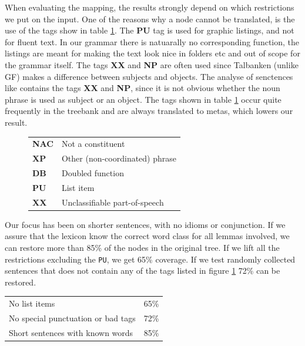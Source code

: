 \documentclass{report}
\begin{document}
When evaluating the mapping, the results strongly depend on which restrictions we
put on the input. 
One of the reasons why a node cannot be translated, is the 
use of the tags show in table \ref{fig:mapBadtag}.
The \textbf{PU} tag is used for graphic listings, and not for fluent text.
In our grammar there is natuarally no corresponding function, 
the listings are meant for making the text look nice in
folders etc and out of scope for the grammar itself. The tags \textbf{XX} and \textbf{NP} are often used since
Talbanken (unlike GF) makes a difference between subjects
and objects. %
The analyse of senctences like
contains the tags \textbf{XX} and \textbf{NP}, since it is not obvious
whether the noun phrase is used as subject or an object.
The tags shown in table \ref{fig:mapBadtag} occur quite frequently in the treebank and are always translated
to metas, which lowers our result. \\
\begin{figure}[h]
\begin{tabular}{ll}
\textbf{NAC} & Not a constituent\\
\textbf{XP} & Other (non-coordinated) phrase\\
\textbf{DB} & Doubled function\\
\textbf{PU} & List item\\
\textbf{XX} & Unclassifiable part-of-speech\\
\end{tabular}
\caption{}\label{fig:mapBadtag}
\end{figure}


Our focus has been on shorter sentences, with no idioms or conjunction.
If we assure that the lexicon know the correct word class for all lemmas
involved, we
can restore more than 85\% of the nodes in the original tree.
If we lift all the restrictions excluding the \verb|PU|, we get
65\% coverage. 
If we test randomly collected sentences that does not contain any of the tags listed
in figure \ref{fig:mapBadtag} 72\% can be restored. \\

\begin{tabular}{|ll|}
\hline
No list items & 65\%\\
No special punctuation or bad tags& 72\%\\
Short sentences with known words & 85\%\\
\hline
\end{tabular}\\
\end{document}
